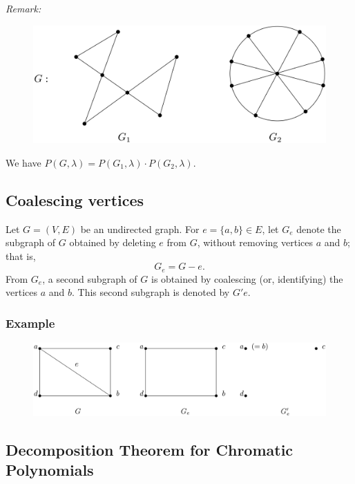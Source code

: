 \documentclass[11pt]{article}
\begin{document}
    \pagebreak

    \emph{Remark:}
    \begin{figure}[H]
        \centering
        \includegraphics[scale=0.2]{poly2.png}
    \end{figure}
    We have \(P(G,\lambda) = P(G_1, \lambda) \cdot P(G_2, \lambda)\). 
    
    \subsection{Coalescing vertices}
    
    Let \(G=(V,E)\) be an undirected graph. For \(e = \{a,b\} \in  E\), let $G_e$ denote the subgraph of $G$ obtained by deleting $e$ from $G$, without removing vertices $a$ and $b$; that is, \[G_e = G - e.\] From $G_e$, a second subgraph of $G$ is obtained by coalescing (or, identifying) the vertices $a$ and $b$. This second subgraph is denoted by \(G'e\).
    
    \subsubsection{Example}

    \begin{figure}[H]
        \centering
        \includegraphics[scale=0.2]{ge.png}
    \end{figure}

    \subsection{Decomposition Theorem for Chromatic Polynomials}
\end{document}
